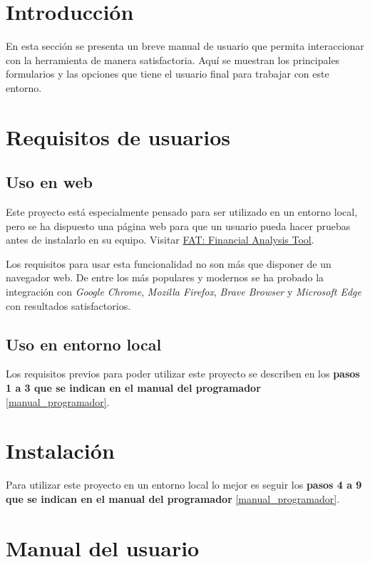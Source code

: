 
\section{Introducción}

En esta sección se presenta un breve manual de usuario que permita interaccionar con la herramienta de manera satisfactoria. Aquí se muestran los principales formularios y las opciones que tiene el usuario final para trabajar con este entorno. 

\section{Requisitos de usuarios}

\subsection{Uso en web}

Este proyecto está especialmente pensado para ser utilizado en un entorno local, pero se ha dispuesto una página web para que un usuario pueda hacer pruebas antes de instalarlo en su equipo. Visitar \href{http://takeiteasy.pythonanywhere.com/}{FAT: Financial Analysis Tool}.

Los requisitos para usar esta funcionalidad no son más que disponer de un navegador web. De entre los más populares y modernos se ha probado la integración con \emph{Google Chrome}, \emph{Mozilla Firefox}, \emph{Brave Browser} y \emph{Microsoft Edge} con resultados satisfactorios. 

\subsection{Uso en entorno local}

Los requisitos previos para poder utilizar este proyecto se describen en los \textbf{pasos 1 a 3 que se indican en el manual del programador} \ref{manual_programador}.


\section{Instalación}

Para utilizar este proyecto en un entorno local lo mejor es seguir los \textbf{pasos 4 a 9 que se indican en el manual del programador} \ref{manual_programador}. 

\section{Manual del usuario}


